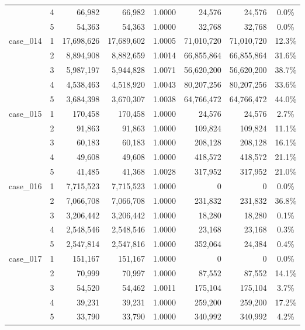 \begin{footnotesize}
\begin{longtable}{l c rr c rr c}
 & 4 & 66{,}982 & 66{,}982 & 1.0000 & 24{,}576 & 24{,}576 & 0.0\% \\
 & 5 & 54{,}363 & 54{,}363 & 1.0000 & 32{,}768 & 32{,}768 & 0.0\% \\
\addlinespace[2pt]
case\_014 & 1 & 17{,}698{,}626 & 17{,}689{,}602 & 1.0005 & 71{,}010{,}720 & 71{,}010{,}720 & 12.3\% \\
 & 2 & 8{,}894{,}908 & 8{,}882{,}659 & 1.0014 & 66{,}855{,}864 & 66{,}855{,}864 & 31.6\% \\
 & 3 & 5{,}987{,}197 & 5{,}944{,}828 & 1.0071 & 56{,}620{,}200 & 56{,}620{,}200 & 38.7\% \\
 & 4 & 4{,}538{,}463 & 4{,}518{,}920 & 1.0043 & 80{,}207{,}256 & 80{,}207{,}256 & 33.6\% \\
 & 5 & 3{,}684{,}398 & 3{,}670{,}307 & 1.0038 & 64{,}766{,}472 & 64{,}766{,}472 & 44.0\% \\
\addlinespace[2pt]
case\_015 & 1 & 170{,}458 & 170{,}458 & 1.0000 & 24{,}576 & 24{,}576 & 2.7\% \\
 & 2 & 91{,}863 & 91{,}863 & 1.0000 & 109{,}824 & 109{,}824 & 11.1\% \\
 & 3 & 60{,}183 & 60{,}183 & 1.0000 & 208{,}128 & 208{,}128 & 16.1\% \\
 & 4 & 49{,}608 & 49{,}608 & 1.0000 & 418{,}572 & 418{,}572 & 21.1\% \\
 & 5 & 41{,}485 & 41{,}368 & 1.0028 & 317{,}952 & 317{,}952 & 21.0\% \\
\addlinespace[2pt]
case\_016 & 1 & 7{,}715{,}523 & 7{,}715{,}523 & 1.0000 & 0 & 0 & 0.0\% \\
 & 2 & 7{,}066{,}708 & 7{,}066{,}708 & 1.0000 & 231{,}832 & 231{,}832 & 36.8\% \\
 & 3 & 3{,}206{,}442 & 3{,}206{,}442 & 1.0000 & 18{,}280 & 18{,}280 & 0.1\% \\
 & 4 & 2{,}548{,}546 & 2{,}548{,}546 & 1.0000 & 23{,}168 & 23{,}168 & 0.3\% \\
 & 5 & 2{,}547{,}814 & 2{,}547{,}816 & 1.0000 & 352{,}064 & 24{,}384 & 0.4\% \\
\addlinespace[2pt]
case\_017 & 1 & 151{,}167 & 151{,}167 & 1.0000 & 0 & 0 & 0.0\% \\
 & 2 & 70{,}999 & 70{,}997 & 1.0000 & 87{,}552 & 87{,}552 & 14.1\% \\
 & 3 & 54{,}520 & 54{,}462 & 1.0011 & 175{,}104 & 175{,}104 & 3.7\% \\
 & 4 & 39{,}231 & 39{,}231 & 1.0000 & 259{,}200 & 259{,}200 & 17.2\% \\
 & 5 & 33{,}790 & 33{,}790 & 1.0000 & 340{,}992 & 340{,}992 & 4.2\% \\

\end{longtable}
\end{footnotesize}

